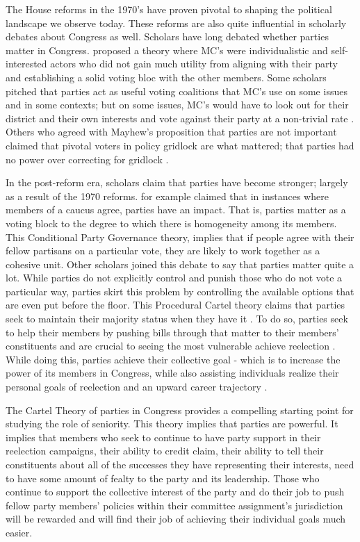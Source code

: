 \documentclass [12pt]{article}
\begin{document}
The House reforms in the 1970's have proven pivotal to shaping the political landscape we observe today. These reforms are also quite influential in scholarly debates about Congress as well. Scholars have long debated whether parties matter in Congress.  proposed a theory where MC's were individualistic and self-interested actors who did not gain much utility from aligning with their party and establishing a solid voting bloc with the other members. Some scholars pitched that parties act as useful voting coalitions that MC's use on some issues and in some contexts; but on some issues, MC's would have to look out for their district and their own interests and vote against their party at a non-trivial rate \cite{Aldrich}. Others who agreed with Mayhew's proposition that parties are not important claimed that pivotal voters in policy gridlock are what mattered; that parties had no power over correcting for gridlock \cite{Krehbiel1991}. 

In the post-reform era, scholars claim that parties have become stronger; largely as a result of the 1970 reforms.  for example claimed that in instances where members of a caucus agree, parties have an impact. That is, parties matter as a voting block to the degree to which there is homogeneity among its members. This Conditional Party Governance theory,  implies that if people agree with their fellow partisans on a particular vote, they are likely to work together as a cohesive unit. Other scholars joined this debate to say that parties matter quite a lot. While parties do not explicitly control and punish those who do not vote a particular way, parties skirt this problem by controlling the available options that are even put before the floor. This Procedural Cartel theory claims that parties seek to maintain their majority status when they have it \cite{Cox2005}. To do so, parties seek to help their members by pushing bills through that matter to their members' constituents and are crucial to seeing the most vulnerable achieve reelection \cite{Cox2005}. While doing this, parties achieve their collective goal - which is to increase the power of its members in Congress, while also assisting individuals realize their personal goals of reelection and an upward career trajectory \cite{Cox2005}. 

The Cartel Theory of parties in Congress provides a compelling starting point for studying the role of seniority. This theory implies that parties are powerful. It implies that members who seek to continue to have party support in their reelection campaigns, their ability to credit claim, their ability to tell their constituents about all of the successes they have representing their interests, need to have some amount of fealty to the party and its leadership. Those who continue to support the collective interest of the party and do their job to push fellow party members' policies within their committee assignment's jurisdiction will be rewarded and will find their job of achieving their individual goals much easier.
\end{document}
